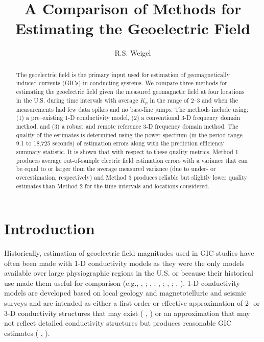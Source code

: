 \documentclass[12pt]{article}
\newcommand{\citeay}[1]{%
\citeauthor{#1}, \citeyear{#1}%
}
\begin{document}
\title{A Comparison of Methods for Estimating the Geoelectric Field}
\author{R.S. Weigel}
\doublespacing
\maketitle

\begin{abstract}
The geoelectric field is the primary input used for estimation of geomagnetically induced currents (GICs) in conducting systems.  We compare three methods for estimating the geoelectric field given the measured geomagnetic field at four locations in the U.S. during time intervals with average $K_p$ in the range of 2--3 and when the measurements had few data spikes and no base-line jumps.  The methods include using: (1) a pre--existing 1-D conductivity model, (2) a conventional 3-D frequency domain method, and (3) a robust and remote reference 3-D frequency domain method.  The quality of the estimates is determined using the power spectrum (in the period range 9.1 to 18,725 seconds) of estimation errors along with the prediction efficiency summary statistic. It is shown that with respect to these quality metrics, Method 1 produces average out-of-sample electric field estimation errors with a variance that can be equal to or larger than the average measured variance (due to under- or overestimation, respectively) and Method 3 produces reliable but slightly lower quality estimates than Method 2 for the time intervals and locations considered. 
\end{abstract}

\section{Introduction}

Historically, estimation of geoelectric field magnitudes used in GIC studies have often been made with 1-D conductivity models as they were the only models available over large physiographic regions in the U.S. or because their historical use made them useful for comparison (e.g., \citeay{Pulkkinen2012}; \citeay{Wei2013}; \citeay{Viljanen2014}; \citeay{Boteler2015}; \citeay{NERC2015}).  1-D conductivity models are developed based on local geology and magnetotelluric and seismic surveys and are intended as either a first-order or effective approximation of 2- or 3-D conductivity structures that may exist (\citeay{Fernberg2012}) or an approximation that may not reflect detailed conductivity structures but produces reasonable GIC estimates (\citeay{Boteler2015}). 
\end{document}
